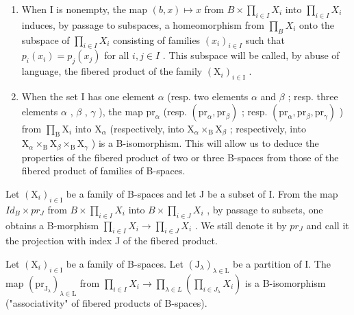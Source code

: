 \begin{enumerate}
\def\labelenumi{\arabic{enumi})}
\setcounter{enumi}{1}
\item
  When I is nonempty, the map \((b,x)\mapsto x\) from \(B\times\prod_{i\in I}X_{i}\) into \(\prod_{i\in I}X_{i}\) induces, by passage to subspaces, a homeomorphism from \(\prod_{B}X_{i}\) onto the subspace of \(\prod_{i\in I}X_{i}\) consisting of families \((x_{i})_{i\in I}\) such that \(p_{i}(x_{i})=p_{j}(x_{j})\) for all \(i,j\in I\) . This subspace will be called, by abuse of language, the fibered product of the family \((\mathrm{X}_{i})_{i\in\mathrm{I}}\) .
\item
  When the set I has one element \(\alpha\) (resp. two elements \(\alpha\) and \(\beta\) ; resp. three elements \(\alpha\) , \(\beta\) , \(\gamma\) ), the map \(\mathrm{pr}_{\alpha}\) (resp. \((\mathrm{pr}_{\alpha}, \mathrm{pr}_{\beta})\) ; resp. \((\mathrm{pr}_{\alpha}, \mathrm{pr}_{\beta}, \mathrm{pr}_{\gamma})\) ) from \(\prod_{\mathrm{B}} \mathrm{X}_i\) into \(\mathrm{X}_{\alpha}\) (respectively, into \(\mathrm{X}_{\alpha} \times_{\mathrm{B}} \mathrm{X}_{\beta}\) ; respectively, into \(\mathrm{X}_{\alpha} \times_{\mathrm{B}} \mathrm{X}_{\beta} \times_{\mathrm{B}} \mathrm{X}_{\gamma}\) ) is a B-isomorphism. This will allow us to deduce the properties of the fibered product of two or three B-spaces from those of the fibered product of families of B-spaces.
\end{enumerate}

Let \((\mathrm{X}_{i})_{i\in\mathrm{I}}\) be a family of B-spaces and let J be a subset of I. From the map \(Id_{B}\times pr_{J}\) from \(B\times\prod_{i\in I}X_{i}\) into \(B\times\prod_{i\in J}X_{i}\) , by passage to subsets, one obtains a B-morphism \(\prod_{i\in I}X_{i}\to\prod_{i\in J}X_{i}\) . We still denote it by \(pr_{J}\) and call it the projection with index J of the fibered product.

Let \((\mathrm{X}_{i})_{i\in\mathrm{I}}\) be a family of B-spaces. Let \((\mathrm{J}_{\lambda})_{\lambda\in\mathrm{L}}\) be a partition of I. The map \((\mathrm{pr}_{\mathrm{J}_{\lambda}})_{\lambda\in\mathrm{L}}\) from \(\prod_{i\in I}X_{i}\to\prod_{\lambda\in L}\left(\prod_{i\in J_{\lambda}}X_{i}\right)\) is a B-isomorphism ("associativity" of fibered products of B-spaces).

